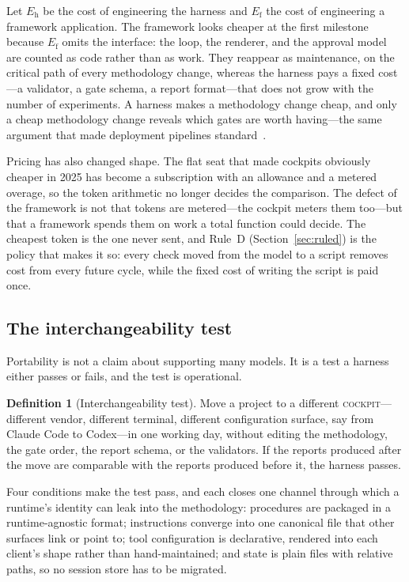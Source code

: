 \documentclass[10pt,a4paper]{article}
\theoremstyle{definition}
\newtheorem{definition}{Definition}[section]
\theoremstyle{plain}
\theoremstyle{principle}
\newcommand{\ck}{\textsc{cockpit}}
\begin{document}
Let $E_{\mathrm{h}}$ be the cost of engineering the harness and $E_{\mathrm{f}}$ the cost of
engineering a framework application. The framework looks cheaper at the first milestone because
$E_{\mathrm{f}}$ omits the interface: the loop, the renderer, and the approval model are counted as
code rather than as work. They reappear as maintenance, on the critical path of every methodology
change, whereas the harness pays a fixed cost---a validator, a gate schema, a report format---that
does not grow with the number of experiments. A harness makes a methodology change cheap, and only
a cheap methodology change reveals which gates are worth having---the same argument that made
deployment pipelines standard~\cite{humble2010}.

Pricing has also changed shape. The flat seat that made cockpits obviously cheaper in 2025 has
become a subscription with an allowance and a metered overage, so the token arithmetic no longer
decides the comparison. The defect of the framework is not that tokens are metered---the cockpit
meters them too---but that a framework spends them on work a total function could decide. The
cheapest token is the one never sent, and Rule~D (Section~\ref{sec:ruled}) is the policy that makes
it so: every check moved from the model to a script removes cost from every future cycle, while the
fixed cost of writing the script is paid once.

\subsection{The interchangeability test}\label{sec:interchange}

Portability is not a claim about supporting many models. It is a test a harness either passes or
fails, and the test is operational.

\begin{definition}[Interchangeability test]\label{def:interchange}
Move a project to a different \ck{}---different vendor, different terminal, different
configuration surface, say from Claude Code to Codex---in one working day, without editing the
methodology, the gate order, the report schema, or the validators. If the reports produced after
the move are comparable with the reports produced before it, the harness passes.
\end{definition}

Four conditions make the test pass, and each closes one channel through which a runtime's identity
can leak into the methodology: procedures are packaged in a runtime-agnostic format; instructions
converge into one canonical file that other surfaces link or point to; tool configuration is
declarative, rendered into each client's shape rather than hand-maintained; and state is plain
files with relative paths, so no session store has to be migrated.
\end{document}
